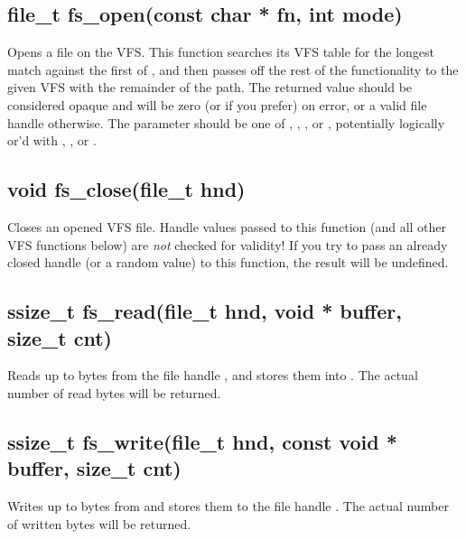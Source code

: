 \documentclass[english]{report}
\begin{document}

\subsection{file\_t fs\_open(const char * fn, int mode)}

Opens a file on the VFS. This function searches its VFS table for
the longest match against the first of , and then passes
off the rest of the functionality to the given VFS with the remainder
of the path. The returned value should be considered opaque and will
be zero (or  if you prefer) on error, or a valid file handle otherwise.
The  parameter should be one of ,
, , or , potentially
logically or'd with , , or
.


\subsection{void fs\_close(file\_t hnd)}

Closes an opened VFS file. Handle values passed to this function (and
all other VFS functions below) are \emph{not} checked for validity!
If you try to pass an already closed handle (or a random value) to
this function, the result will be undefined.


\subsection{ssize\_t fs\_read(file\_t hnd, void * buffer, size\_t cnt)}

Reads up to  bytes from the file handle , and
stores them into . The actual number of read bytes will
be returned.


\subsection{ssize\_t fs\_write(file\_t hnd, const void * buffer, size\_t cnt)}

Writes up to  bytes from  and stores them to
the file handle . The actual number of written bytes will
be returned.

\end{document}
